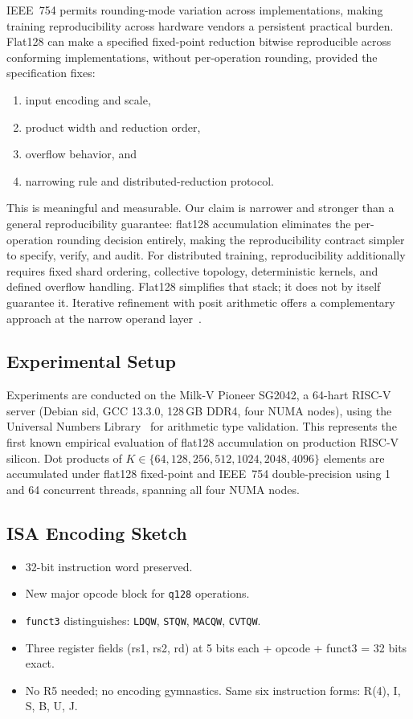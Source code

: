 \documentclass[runningheads]{llncs}
\begin{document}
IEEE~754 permits rounding-mode variation across implementations, making
training reproducibility across hardware vendors a persistent practical
burden. Flat128 can make a specified fixed-point reduction bitwise
reproducible across conforming implementations, without per-operation
rounding, provided the specification fixes:
\begin{enumerate}
\item input encoding and scale,
\item product width and reduction order,
\item overflow behavior, and
\item narrowing rule and distributed-reduction protocol.
\end{enumerate}

This is meaningful and measurable. Our claim is narrower and stronger
than a general reproducibility guarantee: flat128 accumulation eliminates
the per-operation rounding decision entirely, making the reproducibility
contract simpler to specify, verify, and audit. For distributed training,
reproducibility additionally requires fixed shard ordering, collective
topology, deterministic kernels, and defined overflow handling. Flat128
simplifies that stack; it does not by itself guarantee it.
Iterative refinement with posit arithmetic offers a complementary
approach at the narrow operand layer~\cite{quinlan2024iterative}.

\subsection{Experimental Setup}

Experiments are conducted on the Milk-V Pioneer SG2042, a 64-hart
RISC-V server (Debian sid, GCC 13.3.0, 128\,GB DDR4, four NUMA nodes),
using the Universal Numbers Library~\cite{omtzigt2023universal} for
arithmetic type validation.
This represents the first known empirical evaluation of flat128
accumulation on production RISC-V silicon. Dot products of $K \in
\{64, 128, 256, 512, 1024, 2048, 4096\}$ elements are accumulated under
flat128 fixed-point and IEEE~754 double-precision using 1 and 64
concurrent threads, spanning all four NUMA nodes.

\subsection{ISA Encoding Sketch}

\begin{itemize}
\item 32-bit instruction word preserved.
\item New major opcode block for \texttt{q128} operations.
\item \texttt{funct3} distinguishes: \texttt{LDQW}, \texttt{STQW},
  \texttt{MACQW}, \texttt{CVTQW}.
\item Three register fields (rs1, rs2, rd) at 5 bits each + opcode +
  funct3 = 32 bits exact.
\item No R5 needed; no encoding gymnastics. Same six instruction forms:
  R(4), I, S, B, U, J.
\end{itemize}
\end{document}
